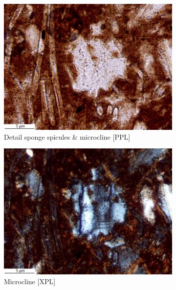 \documentclass[a4paper]{article}
\begin{document}
\begin{figure}[H]
\begin{subfigure}[t]{.32\textwidth}
	\includegraphics[width=\textwidth]{ThinSections/106-2_40x_PPL.jpg}
	\caption{Detail sponge spicules \& microcline [PPL]}
\end{subfigure}\hspace{.1em}\hfill
	\begin{subfigure}[t]{.32\textwidth}
		\includegraphics[width=\textwidth]{ThinSections/106-2_40x_XPL.jpg}
		\caption{Microcline [XPL]}
	\end{subfigure}\hspace{.1em}\hfill
	\begin{subfigure}[t]{.32\textwidth}

\end{subfigure}
\end{figure}
\end{document}

